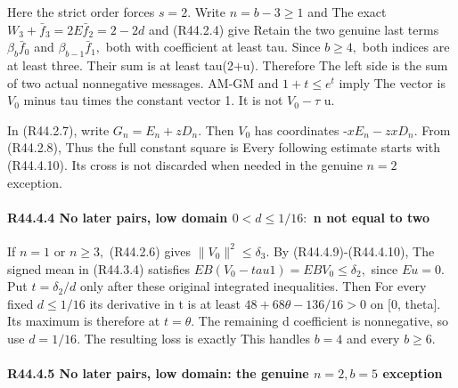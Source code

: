 Here the strict order forces \(s=2.\) Write \(n=b-3\ge 1\) and
The exact \(W_3+\bar f_3=2E\bar f_2=2-2d\) and (R44.2.4) give
Retain the two genuine last terms \(\beta_b \bar f_0\) and
\(\beta_{b-1}\bar f_1,\allowbreak \) both with coefficient at least tau. Since \(b\ge 4,\allowbreak \)
both indices are at least three. Their sum is at least tau(2+u).
Therefore
The left side is the sum of two actual nonnegative messages.
AM-GM and \(1+t\le e^t\) imply
The vector is \(V_0\) minus tau times the constant vector 1. It is
not \(V_0-\tau\) u.

In (R44.2.7), write \(G_n=E_n+zD_n.\) Then \(V_0\) has coordinates
-\(xE_n-zxD_n.\) From (R44.2.8),
Thus the full constant square is
Every following estimate starts with (R44.4.10). Its cross is not
discarded when needed in the genuine \(n=2\) exception.

\paragraph{R44.4.4 No later pairs, low domain \(0<d\le 1/16:\) n not equal to two}

If \(n=1\) or \(n\ge 3,\allowbreak \) (R44.2.6) gives \(\lVert V_0\rVert ^2\le \delta_3.\)
By (R44.4.9)-(R44.4.10),
The signed mean in (R44.3.4) satisfies
\(EB(V_0-tau1)=EBV_0\le \delta_2,\allowbreak \) since \(Eu=0.\) Put \(t=\delta_2/d\) only
after these original integrated inequalities. Then
For every fixed \(d\le 1/16\) its derivative in t is at least
\(48+68\theta-136/16>0\) on [0, theta]. Its maximum is therefore
at \(t=\theta.\) The remaining d coefficient is nonnegative, so use
\(d=1/16.\) The resulting loss is exactly
This handles $b=4$ and every $b\ge6$.

\paragraph{R44.4.5 No later pairs, low domain: the genuine \(n=2,\allowbreak  b=5\) exception}

